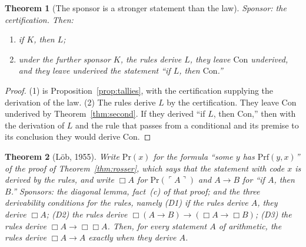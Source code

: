 \documentclass[11pt]{article}
\newtheorem{theorem}{Theorem}[section]
\theoremstyle{definition}
\theoremstyle{remark}
\begin{document}
\begin{theorem}[The sponsor is a stronger statement than the law]\label{thm:stronger}
Sponsor: the certification. Then:
\begin{enumerate}[leftmargin=2em,itemsep=1pt]
\item if $K$, then $L$;
\item under the further sponsor $K$, the rules derive $L$, they leave $\mathrm{Con}$ underived, and they leave underived the statement ``if $L$, then $\mathrm{Con}$.''
\end{enumerate}
\end{theorem}

\begin{proof}
(1) is Proposition~\ref{prop:tallies}, with the certification supplying the derivation of the law. (2) The rules derive $L$ by the certification. They leave $\mathrm{Con}$ underived by Theorem~\ref{thm:second}. If they derived ``if $L$, then $\mathrm{Con}$,'' then with the derivation of $L$ and the rule that passes from a conditional and its premise to its conclusion they would derive $\mathrm{Con}$.
\end{proof}

\begin{theorem}[L\"ob, 1955]\label{thm:lob}
Write $\mathrm{Pr}(x)$ for the formula ``some $y$ has $\mathrm{Prf}(y,x)$'' of the proof of Theorem~\ref{thm:rosser}, which says that the statement with code $x$ is derived by the rules, and write $\Box A$ for $\mathrm{Pr}(\ulcorner A\urcorner)$ and $A\to B$ for ``if $A$, then $B$.'' Sponsors: the diagonal lemma, fact~(c) of that proof; and the three derivability conditions for the rules, namely (D1) if the rules derive $A$, they derive $\Box A$; (D2) the rules derive $\Box(A\to B)\to(\Box A\to\Box B)$; (D3) the rules derive $\Box A\to\Box\Box A$. Then, for every statement $A$ of arithmetic, the rules derive $\Box A\to A$ exactly when they derive $A$.
\end{theorem}
\end{document}
